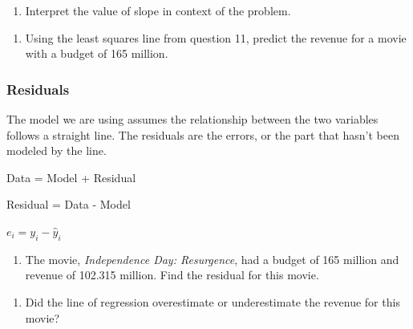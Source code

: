 \documentclass[
]{report}
\providecommand{\tightlist}{%
  \setlength{\itemsep}{0pt}\setlength{\parskip}{0pt}}
\begin{document}
\vspace{.6in}

\begin{enumerate}
\def\labelenumi{\arabic{enumi}.}
\setcounter{enumi}{11}
\tightlist
\item
  Interpret the value of slope in context of the problem.
\end{enumerate}

\vspace{1in}

\begin{enumerate}
\def\labelenumi{\arabic{enumi}.}
\setcounter{enumi}{12}
\tightlist
\item
  Using the least squares line from question 11, predict the revenue for a movie with a budget of 165 million.
\end{enumerate}

\vspace{.6in}

\hypertarget{residuals}{%
\subsubsection*{Residuals}\label{residuals}}

The model we are using assumes the relationship between the two variables follows a straight line. The residuals are the errors, or the part that hasn't been modeled by the line.

\begin{center}
Data = Model + Residual

Residual = Data - Model

$e_i=y_i-\hat{y}_i$
\end{center}

\begin{enumerate}
\def\labelenumi{\arabic{enumi}.}
\setcounter{enumi}{13}
\tightlist
\item
  The movie, \emph{Independence Day: Resurgence}, had a budget of 165 million and revenue of 102.315 million. Find the residual for this movie.
\end{enumerate}

\vspace{.8in}

\begin{enumerate}
\def\labelenumi{\arabic{enumi}.}
\setcounter{enumi}{14}
\tightlist
\item
  Did the line of regression overestimate or underestimate the revenue for this movie?
\end{enumerate}
\end{document}
